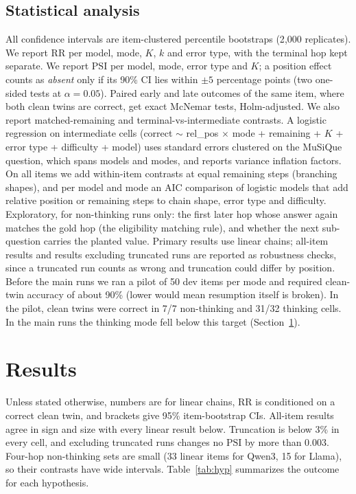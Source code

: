\documentclass[conference]{IEEEtran}
\newcommand{\RR}{\mathrm{RR}}
\newcommand{\PSI}{\mathrm{PSI}}
\begin{document}
\subsection{Statistical analysis}
All confidence intervals are item-clustered percentile bootstraps (2{,}000 replicates).
We report $\RR$ per model, mode, $K$, $k$ and error type, with the terminal hop kept separate.
We report $\PSI$ per model, mode, error type and $K$; a position effect counts as \emph{absent} only if its 90\% CI lies within $\pm5$ percentage points (two one-sided tests at $\alpha=0.05$).
Paired early and late outcomes of the same item, where both clean twins are correct, get exact McNemar tests, Holm-adjusted.
We also report matched-remaining and terminal-vs-intermediate contrasts.
A logistic regression on intermediate cells (correct $\sim$ rel\_pos $\times$ mode + remaining + $K$ + error type + difficulty + model) uses standard errors clustered on the MuSiQue question, which spans models and modes, and reports variance inflation factors.
On all items we add within-item contrasts at equal remaining steps (branching shapes), and per model and mode an AIC comparison of logistic models that add relative position or remaining steps to chain shape, error type and difficulty.
Exploratory, for non-thinking runs only: the first later hop whose answer again matches the gold hop (the eligibility matching rule), and whether the next sub-question carries the planted value.
Primary results use linear chains; all-item results and results excluding truncated runs are reported as robustness checks, since a truncated run counts as wrong and truncation could differ by position. Before the main runs we ran a pilot of 50 dev items per mode and required clean-twin accuracy of about 90\% (lower would mean resumption itself is broken). In the pilot, clean twins were correct in 7/7 non-thinking and 31/32 thinking cells. In the main runs the thinking mode fell below this target (Section~\ref{sec:results}).

\section{Results}
\label{sec:results}
Unless stated otherwise, numbers are for linear chains, $\RR$ is conditioned on a correct clean twin, and brackets give 95\% item-bootstrap CIs. All-item results agree in sign and size with every linear result below. Truncation is below 3\% in every cell, and excluding truncated runs changes no $\PSI$ by more than 0.003. Four-hop non-thinking sets are small (33 linear items for Qwen3, 15 for Llama), so their contrasts have wide intervals. Table~\ref{tab:hyp} summarizes the outcome for each hypothesis.
\end{document}
